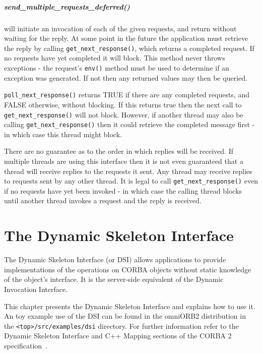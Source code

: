 \documentclass[11pt,twoside,onecolumn]{book}
\begin{document}
\paragraph{send\_multiple\_requests\_deferred()} will initiate an invocation
of each of the given requests, and return without waiting for the reply.
At some point in the future the application must retrieve the reply by
calling {\tt get\_next\_response()}, which returns a completed request.
If no requests have yet completed it will block.
This method never throws exceptions - the request's {\tt env()}
method must be used to determine if an exception was generated. If not
then any returned values may then be queried.

{\tt poll\_next\_response()} returns TRUE if there are any completed requests,
and FALSE otherwise, without blocking. If this returns true then the next call
to {\tt get\_next\_response()} will not block. However, if another
thread may also be calling {\tt get\_next\_response()} then it could retrieve
the completed message first - in which case this thread might block.

There are no guarantee as to the order in which replies will be received.
If multiple threads are using this interface then it is not even guaranteed
that a thread will receive replies to the requests it sent. Any thread may
receive replies to requests sent by any other thread. It is legal to call
{\tt get\_next\_response()} even if no requests have yet been invoked - in
which case the calling thread blocks until another thread invokes a request
and the reply is received.


\chapter{The Dynamic Skeleton Interface}

The Dynamic Skeleton Interface (or DSI) allows applications to provide
implementations of the operations on CORBA objects without static
knowledge of the object's interface. It is the server-side equivalent of the
Dynamic Invocation Interface.

This chapter presents the Dynamic Skeleton Interface and explains how to
use it.
An toy example use of the DSI can be found in the omniORB2 distribution in
the {\tt <top>/src/examples/dsi} directory.
For further information refer to the Dynamic Skeleton Interface
and C++ Mapping sections of the CORBA 2 specification~\cite{corba2-spec}.
\end{document}
